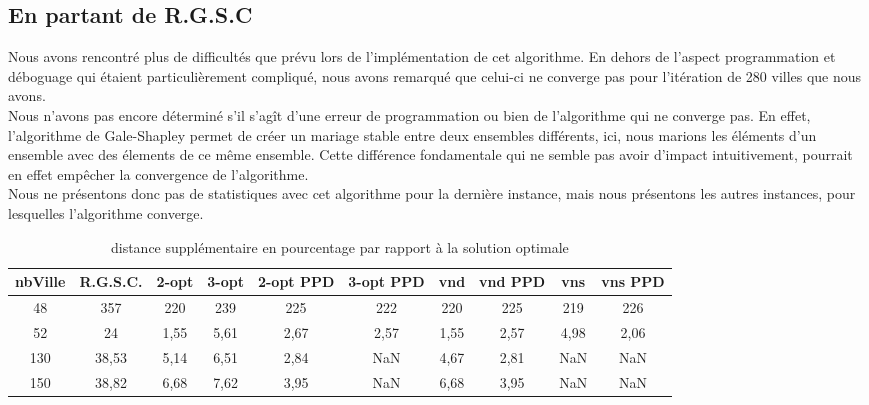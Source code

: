 \documentclass[12pt,a4paper]{article}
\begin{document}
\subsection{En partant de R.G.S.C}
Nous avons rencontré plus de difficultés que prévu lors de l'implémentation de cet algorithme. En dehors de l'aspect programmation et déboguage qui étaient particulièrement compliqué, nous avons remarqué que celui-ci ne converge pas pour l'itération de 280 villes que nous avons.\\
Nous n'avons pas encore déterminé s'il s'agît d'une erreur de programmation ou bien de l'algorithme qui ne converge pas. En effet, l'algorithme de Gale-Shapley permet de créer un mariage stable entre deux ensembles différents, ici, nous marions les éléments d'un ensemble avec des élements de ce même ensemble. Cette différence fondamentale qui ne semble pas avoir d'impact intuitivement, pourrait en effet empêcher la convergence de l'algorithme.\\
Nous ne présentons donc pas de statistiques avec cet algorithme pour la dernière instance, mais nous présentons les autres instances, pour lesquelles l'algorithme converge.\\
\begin{table}[!h]
\centering
\begin{tabular}{|*{10}{c|}}
  \hline
  nbVille & R.G.S.C. & 2-opt & 3-opt & 2-opt PPD & 3-opt PPD & vnd & vnd PPD & vns & vns PPD \\
  \hline
  48 & 357 & 220 & 239 & 225 & 222 & 220 & 225 & 219 & 226 \\
  52 & 24 & 1,55 & 5,61 & 2,67 & 2,57 & 1,55 & 2,57 & 4,98 & 2,06 \\
  130 & 38,53 & 5,14 & 6,51 & 2,84 & NaN & 4,67 & 2,81 & NaN & NaN \\
  150 & 38,82 & 6,68 & 7,62 & 3,95 & NaN & 6,68 & 3,95 & NaN & NaN \\
  \hline
\end{tabular}
\caption{distance supplémentaire en pourcentage par rapport à la solution optimale}
\label{NNHpourcentageperf}
\end{table}
\end{document}
